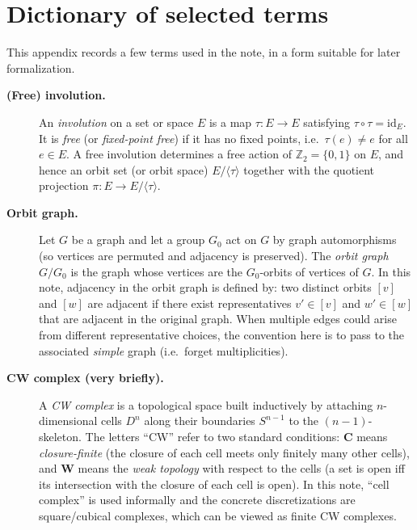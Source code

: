 \documentclass[11pt,a4paper]{article}
\theoremstyle{definition}
\theoremstyle{remark}
\begin{document}
\section{Dictionary of selected terms}
\label{app:dictionary}

This appendix records a few terms used in the note, in a form suitable for later formalization.

\begin{description}
  \item[\textbf{(Free) involution.}]
  An \emph{involution} on a set or space \(E\) is a map \(\tau:E\to E\) satisfying \(\tau\circ\tau=\mathrm{id}_E\).
  It is \emph{free} (or \emph{fixed-point free}) if it has no fixed points, i.e.\ \(\tau(e)\neq e\) for all \(e\in E\).
  A free involution determines a free action of \(\mathbb{Z}_2=\{0,1\}\) on \(E\), and hence an orbit set (or orbit space) \(E/\langle\tau\rangle\) together with the quotient projection \(\pi:E\to E/\langle\tau\rangle\).

  \item[\textbf{Orbit graph.}]
  Let \(G\) be a graph and let a group \(G_0\) act on \(G\) by graph automorphisms (so vertices are permuted and adjacency is preserved). The \emph{orbit graph} \(G/G_0\) is the graph whose vertices are the \(G_0\)-orbits of vertices of \(G\).
  In this note, adjacency in the orbit graph is defined by: two distinct orbits \([v]\) and \([w]\) are adjacent if there exist representatives \(v'\in[v]\) and \(w'\in[w]\) that are adjacent in the original graph. When multiple edges could arise from different representative choices, the convention here is to pass to the associated \emph{simple} graph (i.e.\ forget multiplicities).

  \item[\textbf{CW complex (very briefly).}]
  A \emph{CW complex} is a topological space built inductively by attaching \(n\)-dimensional cells \(D^n\) along their boundaries \(S^{n-1}\) to the \((n-1)\)-skeleton.
  The letters ``CW'' refer to two standard conditions: \textbf{C} means \emph{closure-finite} (the closure of each cell meets only finitely many other cells), and \textbf{W} means the \emph{weak topology} with respect to the cells (a set is open iff its intersection with the closure of each cell is open).
  In this note, ``cell complex'' is used informally and the concrete discretizations are square/cubical complexes, which can be viewed as finite CW complexes.


\end{description}
\end{document}
